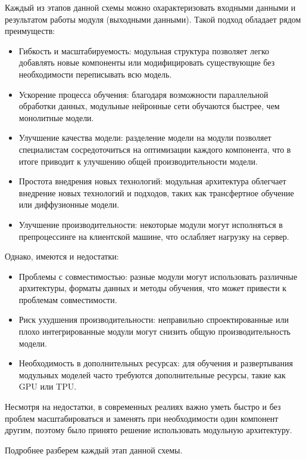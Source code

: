 Каждый из этапов данной схемы можно охарактеризовать входными данными и результатом работы модуля (выходными данными).
Такой подход обладает рядом преимуществ:
\begin{itemize}
    \item Гибкость и масштабируемость: модульная структура позволяет легко добавлять новые компоненты или модифицировать существующие без необходимости переписывать всю модель.
    \item Ускорение процесса обучения: благодаря возможности параллельной обработки данных, модульные нейронные сети обучаются быстрее, чем монолитные модели.
    \item Улучшение качества модели: разделение модели на модули позволяет специалистам сосредоточиться на оптимизации каждого компонента, что в итоге приводит к улучшению общей производительности модели.
    \item Простота внедрения новых технологий: модульная архитектура облегчает внедрение новых технологий и подходов, таких как трансфертное обучение или диффузионные модели.
    \item Улучшение производительности: некоторые модули могут исполняться в препроцессинге на клиентской машине, что ослабляет нагрузку на сервер.
\end{itemize}
Однако, имеются и недостатки:
\begin{itemize}
    \item Проблемы с совместимостью: разные модули могут использовать различные архитектуры, форматы данных и методы обучения, что может привести к проблемам совместимости.
    \item Риск ухудшения производительности: неправильно спроектированные или плохо интегрированные модули могут снизить общую производительность модели.
    \item Необходимость в дополнительных ресурсах: для обучения и развертывания модульных моделей часто требуются дополнительные ресурсы, такие как GPU или TPU.
\end{itemize}

Несмотря на недостатки, в современных реалиях важно уметь быстро и без проблем масштабироваться и заменять при необходимости один компонент другим, поэтому было принято решение использовать модульную архитектуру.

Подробнее разберем каждый этап данной схемы.